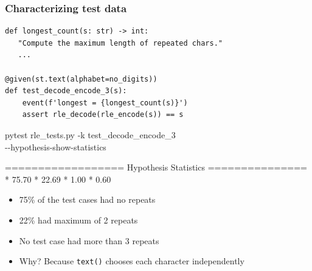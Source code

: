 \documentclass{beamer}
\begin{document}
\begin{frame}
  \frametitle{Characterizing test data}

\begin{verbatim}
def longest_count(s: str) -> int:
   "Compute the maximum length of repeated chars."
   ...

@given(st.text(alphabet=no_digits))
def test_decode_encode_3(s):
    event(f'longest = {longest_count(s)}')
    assert rle_decode(rle_encode(s)) == s
\end{verbatim}

  \framebreak
  
\begin{semiverbatim}
pytest rle_tests.py -k test_decode_encode_3 \\
        -{}-hypothesis-show-statistics

================== Hypothesis Statistics ===============
      * 75.70%
      * 22.69%
      * 1.00%
      * 0.60%
\end{semiverbatim}

\begin{itemize}
\item 75\% of the test cases had no repeats
\item 22\% had maximum of 2 repeats
\item No test case had more than 3 repeats
\item Why? Because \texttt{text()} 
   chooses each character independently
\end{itemize}
\end{frame}
\end{document}
